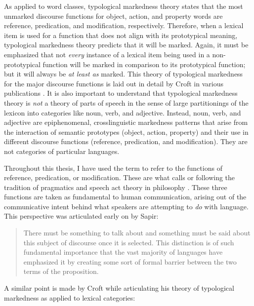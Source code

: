 As applied to word classes, typological markedness theory states that the most unmarked discourse functions for object, action, and property words are reference, predication, and modification, respectively. Therefore, when a lexical item is used for a function that does not align with its prototypical meaning, typological markedness theory predicts that it will be marked. Again, it must be emphasized that not \emph{every} instance of a lexical item being used in a non-prototypical function will be marked in comparison to its prototypical function; but it will always be \emph{at least as} marked. This theory of typological markedness for the major discourse functions is laid out in detail by Croft in various publications \parencites{Croft1991}{Croft2000}{Croft2001b}{CroftLier2012}. It is also important to understand that typological markedness theory is \emph{not} a theory of parts of speech in the sense of large partitionings of the lexicon into categories like noun, verb, and adjective. Instead, noun, verb, and adjective are epiphenomenal, crosslinguistic markedness patterns that arise from the interaction of semantic prototypes (object, action, property) and their use in different discourse functions (reference, predication, and modification). They are not categories of particular languages.

Throughout this thesis, I have used the term  to refer to the functions of reference, predication, or modification. These are what \textcite[51]{Croft1991} calls  or  following the tradition of pragmatics and speech act theory in philosophy \parencites{Austin1962}{Searle1969}. These three functions are taken as fundamental to human communication, arising out of the communicative intent behind what speakers are attempting to \emph{do} with language. This perspective was articulated early on by Sapir:

\blockquote[{\cite[87]{Sapir1921}}]{There must be something to talk about and something must be said about this subject of discourse once it is selected. This distinction is of such fundamental importance that the vast majority of languages have emphasized it by creating some sort of formal barrier between the two terms of the proposition.}

\noindent A similar point is made by Croft while articulating his theory of typological markedness as applied to lexical categories: 


